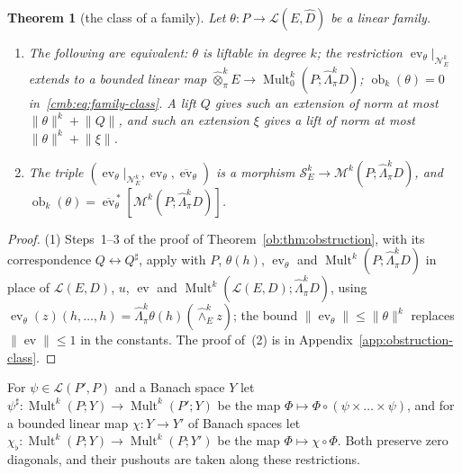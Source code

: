 \documentclass[11pt]{amsart}
\newtheorem{theorem}{Theorem}[section]
\theoremstyle{definition}
\theoremstyle{remark}
\numberwithin{equation}{section}
\newcommand{\cL}{\mathcal L}
\newcommand{\Mult}{\operatorname{Mult}}
\newcommand{\norm}[1]{\lVert #1\rVert}
\theoremstyle{plain}
\theoremstyle{definition}
\theoremstyle{plain}
\newcommand{\ev}{\operatorname{ev}}
\newcommand{\ob}{\operatorname{ob}}
\newcommand{\cN}{\mathcal N}
\newcommand{\cS}{\mathcal S}
\newcommand{\cM}{\mathcal M}
\begin{document}
\begin{theorem}[the class of a family]\label{cmb:thm:family}
Let $\theta\colon P\to\cL(E,\widehat D)$ be a linear family.
\begin{enumerate}
\item The following are equivalent: $\theta$ is liftable in degree $k$; the restriction $\ev_\theta|_{\cN^k_E}$ extends to a
bounded linear map $\widehat\otimes^k_\pi E\to\Mult^k_0(P;\widehat\Lambda^k_\pi D)$; $\ob_k(\theta)=0$
in~\eqref{cmb:eq:family-class}. A lift $Q$ gives such
an extension of norm at most $\norm\theta^k+\norm Q$, and such an extension $\xi$ gives a lift of norm at most
$\norm\theta^k+\norm\xi$.
\item The triple $(\ev_\theta|_{\cN^k_E},\ev_\theta,\overline{\ev}_\theta)$ is a morphism
$\cS^k_E\to\cM^k(P;\widehat\Lambda^k_\pi D)$, and $\ob_k(\theta)=\overline{\ev}_\theta^{\,*}[\cM^k(P;\widehat\Lambda^k_\pi D)]$.
\end{enumerate}
\end{theorem}

\begin{proof}
(1) Steps~1--3 of the proof of Theorem~\ref{ob:thm:obstruction}, with its correspondence $Q\leftrightarrow Q^\sharp$,
apply with $P$, $\theta(h)$, $\ev_\theta$ and $\Mult^k(P;\widehat\Lambda^k_\pi D)$ in place of $\cL(E,D)$, $u$, $\ev$ and
$\Mult^k(\cL(E,D);\widehat\Lambda^k_\pi D)$, using $\ev_\theta(z)(h,\dots,h)=\widehat\Lambda^k_\pi\theta(h)(\widehat\wedge^k_Ez)$;
the bound $\norm{\ev_\theta}\le\norm\theta^k$ replaces $\norm\ev\le1$ in the constants. The proof of~(2) is in
Appendix~\ref{app:obstruction-class}.
\end{proof}

For $\psi\in\cL(P',P)$ and a Banach space $Y$ let $\psi^\sharp\colon\Mult^k(P;Y)\to\Mult^k(P';Y)$ be the map
$\Phi\mapsto\Phi\circ(\psi\times\dots\times\psi)$, and for a bounded linear map $\chi\colon Y\to Y'$ of Banach spaces let
$\chi_\flat\colon\Mult^k(P;Y)\to\Mult^k(P;Y')$ be the map $\Phi\mapsto\chi\circ\Phi$. Both preserve zero diagonals, and their
pushouts are taken along these restrictions.
\end{document}
